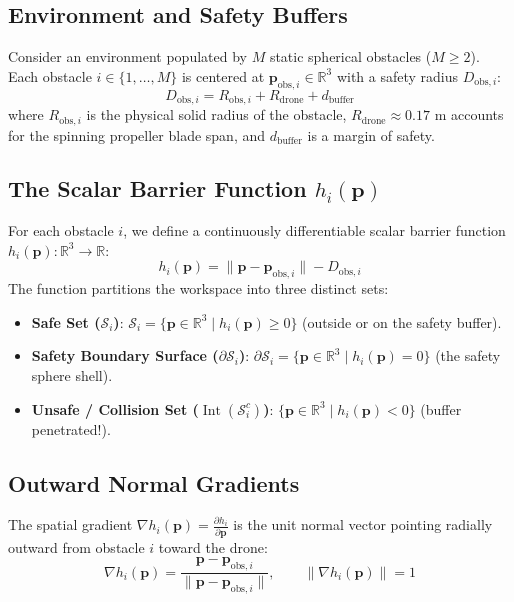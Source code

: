 \documentclass[11pt,a4paper]{article}
\begin{document}
\subsection{Environment and Safety Buffers}
Consider an environment populated by $M$ static spherical obstacles ($M \ge 2$). Each obstacle $i \in \{1, \dots, M\}$ is centered at $\mathbf{p}_{\mathrm{obs}, i} \in \mathbb{R}^3$ with a safety radius $D_{\mathrm{obs}, i}$:
\begin{equation}
D_{\mathrm{obs}, i} = R_{\mathrm{obs}, i} + R_{\mathrm{drone}} + d_{\mathrm{buffer}}
\label{eq:safety_radius}
\end{equation}
where $R_{\mathrm{obs}, i}$ is the physical solid radius of the obstacle, $R_{\mathrm{drone}} \approx 0.17\text{ m}$ accounts for the spinning propeller blade span, and $d_{\mathrm{buffer}}$ is a margin of safety.

\subsection{The Scalar Barrier Function \texorpdfstring{$h_i(\mathbf{p})$}{hi(p)}}
For each obstacle $i$, we define a continuously differentiable scalar barrier function $h_i(\mathbf{p}): \mathbb{R}^3 \to \mathbb{R}$:
\begin{equation}
h_i(\mathbf{p}) = \|\mathbf{p} - \mathbf{p}_{\mathrm{obs}, i}\| - D_{\mathrm{obs}, i}
\label{eq:barrier_func}
\end{equation}
The function partitions the workspace into three distinct sets:
\begin{itemize}
    \item \textbf{Safe Set ($\mathcal{S}_i$)}: $\mathcal{S}_i = \{\mathbf{p} \in \mathbb{R}^3 \mid h_i(\mathbf{p}) \ge 0\}$ (outside or on the safety buffer).
    \item \textbf{Safety Boundary Surface ($\partial \mathcal{S}_i$)}: $\partial\mathcal{S}_i = \{\mathbf{p} \in \mathbb{R}^3 \mid h_i(\mathbf{p}) = 0\}$ (the safety sphere shell).
    \item \textbf{Unsafe / Collision Set ($\operatorname{Int}(\mathcal{S}_i^c)$)}: $\{\mathbf{p} \in \mathbb{R}^3 \mid h_i(\mathbf{p}) < 0\}$ (buffer penetrated!).
\end{itemize}

\subsection{Outward Normal Gradients}
The spatial gradient $\nabla h_i(\mathbf{p}) = \frac{\partial h_i}{\partial \mathbf{p}}$ is the unit normal vector pointing radially outward from obstacle $i$ toward the drone:
\begin{equation}
\nabla h_i(\mathbf{p}) = \frac{\mathbf{p} - \mathbf{p}_{\mathrm{obs}, i}}{\|\mathbf{p} - \mathbf{p}_{\mathrm{obs}, i}\|}, \qquad \|\nabla h_i(\mathbf{p})\| = 1
\label{eq:cbf_gradient}
\end{equation}
\end{document}

